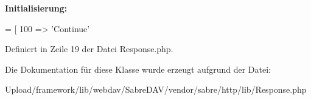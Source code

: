 {\bfseries Initialisierung\+:}
\begin{DoxyCode}
= [
        100 => \textcolor{stringliteral}{'Continue'}
\end{DoxyCode}


Definiert in Zeile 19 der Datei Response.\+php.



Die Dokumentation für diese Klasse wurde erzeugt aufgrund der Datei\+:\begin{DoxyCompactItemize}
\item 
Upload/framework/lib/webdav/\+Sabre\+D\+A\+V/vendor/sabre/http/lib/Response.\+php\end{DoxyCompactItemize}
